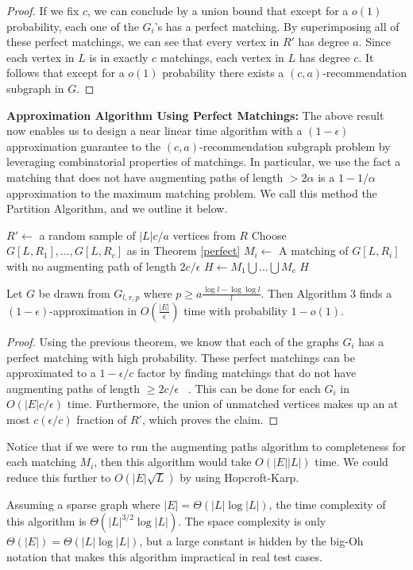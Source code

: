 \begin{proof}
If we fix $c$, we can conclude by a union bound that except
for a $o(1)$ probability, each one of the $G_i$'s has a perfect matching. By
superimposing all of these perfect matchings, we can see that every vertex in
$R'$ has degree $a$. Since each vertex in $L$ is in exactly $c$ matchings, each
vertex in $L$ has degree $c$. It follows that except for a $o(1)$ probability
there exists a $(c,a)$-recommendation subgraph in $G$.
\end{proof}

{\bf Approximation Algorithm Using Perfect Matchings:}
The above result now enables us to design a near linear time
algorithm with a $(1-\epsilon)$ approximation guarantee
to the $(c,a)$-recommendation subgraph problem by leveraging
combinatorial properties of matchings. In particular, we use
the fact a matching that does not have augmenting paths of
length $>2\alpha$ is a $1-1/\alpha$ approximation to the maximum
matching problem. We call this method the Partition Algorithm,
and we outline it below.

\begin{algorithm}[h]\label{partition_alg}
  \SetAlgoLined
  $R' \leftarrow$ a random sample of $|L|c/a$ vertices from $R$\;
  Choose $G[L,R_1],\ldots,G[L,R_c]$ as in Theorem \ref{perfect}\;
   {
    $M_i \leftarrow$ A matching of $G[L,R_i]$ with no augmenting path of length $2c/\epsilon$\;
  }
  $H \leftarrow M_1\bigcup\ldots \bigcup M_c$\;
  \Return $H$\;
  \caption{The partition algorithm}
\end{algorithm}
\vspace{-.2cm}

\begin{thm}
Let $G$ be drawn from $G_{l,r,p}$ where $p \geq a\frac{\log l - \log\log l}{l}$.
Then Algorithm 3 finds a $(1-\epsilon)$-approximation
in $O(\frac{|E|}{\epsilon})$ time with probability $1-o(1)$.
\end{thm}
\begin{proof}
Using the previous theorem, we know that each of the graphs $G_i$ has a
perfect matching with high probability. These perfect matchings
can be approximated to a $1-\epsilon/c$ factor by finding matchings
that do not have augmenting paths of length $\geq 2c/\epsilon$
~\cite{LovaszPlummer1986}. This can be done for each $G_i$ in
$O(|E|c/\epsilon)$ time. Furthermore, the union of unmatched vertices
makes up an at most $c(\epsilon/c)$ fraction of $R'$, which proves the claim.
\end{proof}

Notice that if we were to run the augmenting paths algorithm to completeness
for each matching $M_i$, then this algorithm would take $O(|E||L|)$ time. We
could reduce this further to $O(|E|\sqrt{L})$ by using Hopcroft-Karp.
\cite{HopcroftKarp} \vs

Assuming
a sparse graph where $|E|=\Theta(|L|\log|L|)$, the time complexity of this algorithm is $\Theta(|L|^{3/2}\log|L|)$.  The space complexity
is only $\Theta(|E|) = \Theta(|L|\log|L|)$, but a large constant is hidden by
the big-Oh notation that makes this algorithm impractical in real test cases. 
